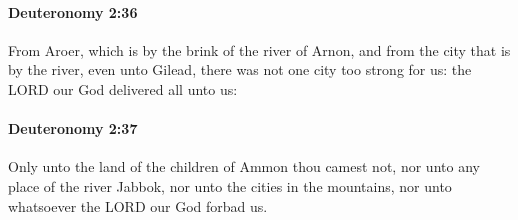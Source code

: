 		\paragraph{Deuteronomy 2:36} %
			\label{DEUTERONOMY-2-36}

			From Aroer, which is by the brink of the river of Arnon, and from the city that is by the river, even unto Gilead, there was not one city too strong for us: the LORD our God delivered all unto us:


		\paragraph{Deuteronomy 2:37} %
			\label{DEUTERONOMY-2-37}

			Only unto the land of the children of Ammon thou camest not, nor unto any place of the river Jabbok, nor unto the cities in the mountains, nor unto whatsoever the LORD our God forbad us.

